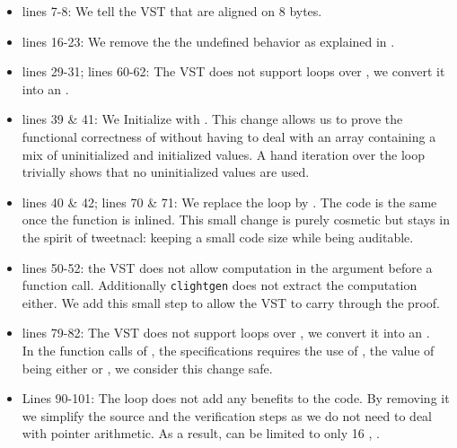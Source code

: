 \begin{itemize}
  \item lines 7-8: We tell the VST that  are
  aligned on 8 bytes.

  \item lines 16-23: We remove the the undefined behavior as explained in .

  \item lines 29-31; lines 60-62: The VST does not support  loops over , we convert it into an .

  \item lines 39 \& 41: We Initialize  with .
  This change allows us to prove the functional correctness of  without having to deal with an array containing
  a mix of uninitialized and initialized values.
  A hand iteration over the loop trivially shows that no uninitialized values are used.

  \item lines 40 \& 42; lines 70 \& 71: We replace the  loop by . The code is the same once the function is inlined. This small change is purely cosmetic but stays in the spirit of tweetnacl: keeping a small code size while being auditable.

  \item lines 50-52: the VST does not allow computation in the argument before a function call. Additionally \texttt{clightgen} does not extract the computation either. We add this small step to allow the VST to carry through the proof.



  \item lines 79-82: The VST does not support  loops over , we convert it into an .\\
  In the function calls of , the specifications requires the use of , the value of  being either  or , we consider this change safe.

  \item Lines 90-101: The  loop does not add any benefits to the code. By removing it we simplify the source and the verification steps as we do not need to deal with pointer arithmetic. As a result,  can be limited to only 16 , \ie {}.

\end{itemize}
